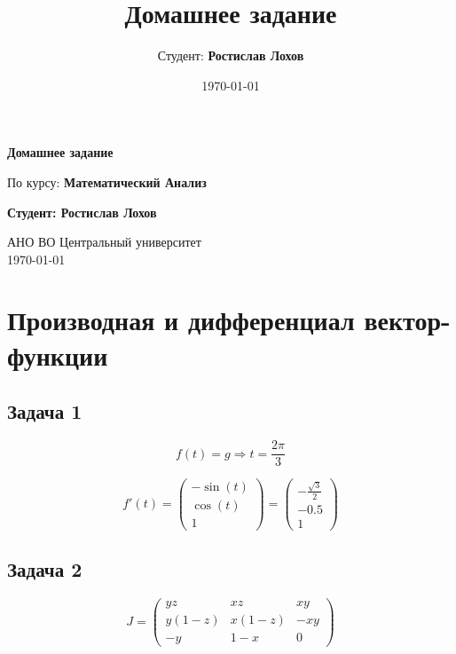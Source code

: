 \documentclass[a4paper,12pt]{article}
\title{Домашнее задание}
\author{Студент: \textbf{Ростислав Лохов}}
\date{\today}
\begin{document}
\begin{titlepage}
    \centering
    \vspace*{1cm}

    \Huge
    \textbf{Домашнее задание}

    \vspace{0.5cm}
    \LARGE
    По курсу: \textbf{Математический Анализ}

    \vspace{1.5cm}

    \textbf{Студент: Ростислав Лохов}

    \vfill

    \Large
    АНО ВО Центральный университет\\
    \vspace{0.3cm}
    \today

\end{titlepage}

\tableofcontents
\newpage

\section{Производная и дифференциал вектор-функции}

\subsection{Задача 1}
\[
f(t)= g  \Rightarrow t = \frac{2\pi}{3}
\]

\[
f'(t) = \begin{pmatrix}
    -\sin(t) \\
    \cos(t) \\
    1
\end{pmatrix} = 
\begin{pmatrix}
    -\frac{\sqrt{3}}{2} \\
    -0.5 \\
    1
\end{pmatrix}
\]


\subsection{Задача 2}

\[
J = 
\begin{pmatrix}
    yz & xz & xy \\
    y(1-z) & x(1-z) & -xy \\
    -y & 1-x & 0 
\end{pmatrix}
\]
\end{document}
